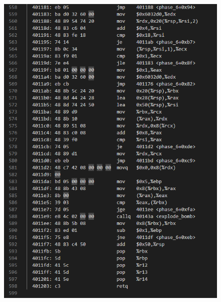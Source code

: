 \documentclass[12pt, a4paper, oneside]{ctexart}
\begin{document}
\begin{figure}[htbp]
    \includegraphics[scale=0.56]{image/2.7-2.png}
\end{figure}
\end{document}
